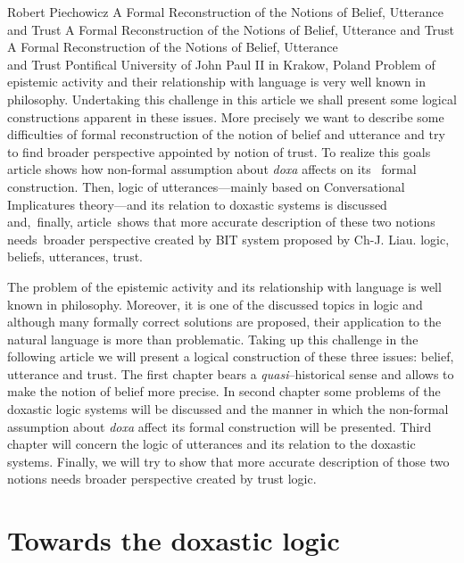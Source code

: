 \begin{artengenv}{Robert Piechowicz}
	{A Formal Reconstruction of the Notions of Belief, Utterance and Trust}
	{A Formal Reconstruction of the Notions of Belief, Utterance and Trust}
	{A Formal Reconstruction of the Notions of Belief, Utterance\\and Trust}
	{Pontifical University of John Paul II in Krakow, Poland}
	{Problem of epistemic activity and their relationship with language is very well known in philosophy. Undertaking this challenge in this article we shall present some logical constructions apparent in these issues. More precisely we want to describe some difficulties of formal reconstruction of the notion of belief and utterance and try to find broader perspective appointed by notion of trust. To realize this goals article shows how non-formal assumption about \textit{doxa} affects on its  formal construction. Then, logic of utterances---mainly based on Conversational Implicatures theory---and its relation to doxastic systems is discussed and, finally, article shows that more accurate description of these two notions needs broader perspective created by BIT system proposed by Ch-J. Liau.}
	{logic, beliefs, utterances, trust.}



\indent The problem of the epistemic activity and its relationship with language is well known in philosophy. Moreover, it is one of the discussed topics in logic and although many formally correct solutions are proposed, their application to the natural language is more than problematic. Taking up this challenge in the following article we will present a logical construction of these three issues: belief, utterance and trust. The first chapter bears a \textit{quasi}--historical sense and allows to make the notion of belief more precise. In second chapter some problems of the doxastic logic systems will be discussed and the manner in which the non-formal assumption about \textit{doxa} affect its formal construction will be presented. Third chapter will concern the logic of utterances and its relation to the doxastic systems. Finally, we will try to show that more accurate description of those two notions needs broader perspective created by trust logic.

\section{Towards the doxastic logic}


\end{artengenv}
